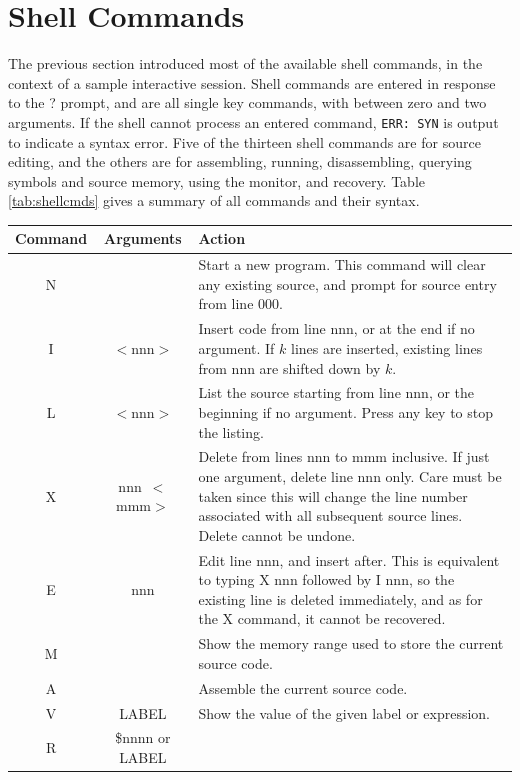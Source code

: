 \documentclass[12pt]{article}
\newcommand{\replica}[1]{\textsf{#1}}
\begin{document}
\section{Shell Commands}

The previous section introduced most of the available shell commands, in the context of a sample interactive session.
Shell commands are entered in response to the \replica{?} prompt, and are all single key commands, with between zero and two arguments.  If the shell cannot process an entered command, \texttt{ERR: SYN} is output to indicate a syntax error.  Five of the thirteen shell commands are for source editing, and the others are for assembling, running, disassembling, querying symbols and source memory, using the monitor, and recovery.
Table \ref{tab:shellcmds} gives a summary of all commands and their syntax.
\begin{table}[p]
	\centering
	\begin{tabular}{|c|c|p{10cm}|} \hline
	\textbf{Command} & \textbf{Arguments} & \textbf{Action} \tabularnewline
	\hline
	\replica{N} & & Start a new program.  This command will
									clear any existing source, and prompt
									for source entry from line 000.\tabularnewline
	\replica{I} & $<$\replica{nnn}$>$ & Insert code from line \replica{nnn}, or at
									the end if no argument.  If $k$ lines are inserted, existing
									lines from \replica{nnn} are shifted down by $k$.\tabularnewline
	\replica{L} & $<$\replica{nnn}$>$ & List the source starting from line
									\replica{nnn}, or the beginning if no argument.  Press any key to stop the listing.\tabularnewline
	\replica{X} & \replica{nnn~}$<$\replica{mmm}$>$ & Delete from lines
									\replica{nnn} to \replica{mmm} inclusive.  If just one
									argument, delete line \replica{nnn} only.  Care must be taken
									since this will change the line number associated with all
									subsequent source lines.  Delete cannot be undone.\tabularnewline
	\replica{E} & \replica{nnn} & Edit line \replica{nnn}, and insert after.
									This is equivalent to typing \replica{X nnn} followed by
									\replica{I nnn}, so the existing line is deleted
									immediately, and as for the \replica{X} command, it
									cannot be recovered.\tabularnewline
	\replica{M} & & Show the memory range used to store the current source 
									code.\tabularnewline
	\replica{A} & & Assemble the current source code.\tabularnewline
	\replica{V} & \replica{LABEL} & Show the value of the given label or expression.\tabularnewline
	\replica{R} & \replica{\$nnnn} or \replica{LABEL} & 

\end{tabular}
\end{table}
\end{document}
